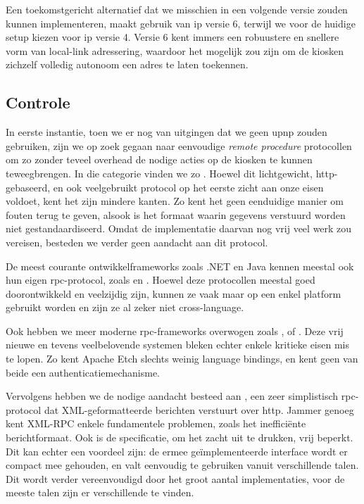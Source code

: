 Een toekomstgericht alternatief dat we misschien in een volgende versie zouden kunnen implementeren, maakt gebruik van \ac{ip} versie 6, terwijl we voor de huidige setup kiezen voor \ac{ip} versie 4. Versie 6 kent immers een robuustere en snellere vorm van local-link adressering, waardoor het mogelijk zou zijn om de kiosken zichzelf volledig autonoom een adres te laten toekennen.

\subsection{Controle}

In eerste instantie, toen we er nog van uitgingen dat we geen \ac{upnp} zouden gebruiken, zijn we op zoek gegaan naar eenvoudige \emph{remote procedure} protocollen om zo zonder teveel overhead de nodige acties op de kiosken te kunnen teweegbrengen. In die categorie vinden we zo . Hoewel dit lichtgewicht, \ac{http}-gebaseerd, en ook veelgebruikt protocol op het eerste zicht aan onze eisen voldoet, kent het zijn mindere kanten. Zo kent het geen eenduidige manier om fouten terug te geven, alsook is het formaat waarin gegevens verstuurd worden niet gestandaardiseerd. Omdat de implementatie daarvan nog vrij veel werk zou vereisen, besteden we verder geen aandacht aan dit protocol.

De meest courante ontwikkelframeworks zoals .NET en Java kennen meestal ook hun eigen \ac{rpc}-protocol, zoals  en . Hoewel deze protocollen meestal goed doorontwikkeld en veelzijdig zijn, kunnen ze vaak maar op een enkel platform gebruikt worden en zijn ze al zeker niet cross-language.

Ook hebben we meer moderne \ac{rpc}-frameworks overwogen zoals , of . Deze vrij nieuwe en tevens veelbelovende systemen bleken echter enkele kritieke eisen mis te lopen. Zo kent Apache Etch slechts weinig language bindings, en kent geen van beide een authenticatiemechanisme.

Vervolgens hebben we de nodige aandacht besteed aan , een zeer simplistisch \ac{rpc}-protocol dat XML-geformatteerde berichten verstuurt over \ac{http}. Jammer genoeg kent XML-RPC enkele fundamentele problemen, zoals het inefficiënte berichtformaat. Ook is de specificatie, om het zacht uit te drukken, vrij beperkt. Dit kan echter een voordeel zijn: de ermee geïmplementeerde interface wordt er compact mee gehouden, en valt eenvoudig te gebruiken vanuit verschillende talen. Dit wordt verder vereenvoudigd door het groot aantal implementaties, voor de meeste talen zijn er verschillende te vinden.

